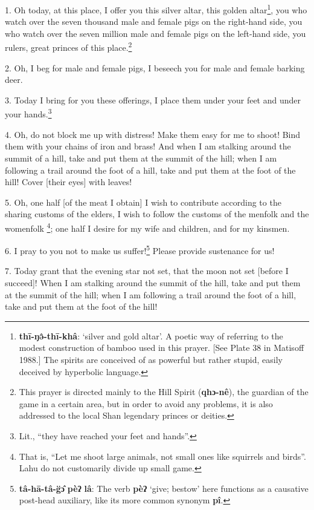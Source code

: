 \setcounter{footnote}{0}

1. Oh today, at this place, I offer you this silver altar, this golden altar\footnote{\textbf{thī-ŋə̂-thī-khâ}: `silver and gold altar'. A poetic way of referring to the modest construction of bamboo used in this prayer. [See Plate 38 in Matisoff 1988.] The spirits are conceived of as powerful but rather stupid, easily deceived by hyperbolic language.},
you who watch over the seven thousand male and female pigs on the right-hand side,
you who watch over the seven million male and female pigs on the left-hand side,
you rulers, great princes of this place.\footnote{This prayer is directed mainly to the Hill Spirit (\textbf{qhɔ-nê}), the guardian of the game in a certain area, but in order to avoid any problems, it is also addressed to the local Shan legendary princes or deities.}

2. Oh, I beg for male and female pigs, I beseech you for male and female barking
deer.

3. Today I bring for you these offerings, I place them under your feet and under
your hands.\footnote{Lit., ``they have reached your feet and hands''.}

4. Oh, do not block me up with distress! Make them easy for me to shoot! Bind them
with your chains of iron and brass! And when I am stalking around the summit of
a hill, take and put them at the summit of the hill; when I am following a trail
around the foot of a hill, take and put them at the foot of the hill! Cover [their
eyes] with leaves!

5. Oh, one half [of the meat I obtain] I wish to contribute according to the sharing
customs of the elders, I wish to follow the customs of the menfolk and the womenfolk
\footnote{That is, ``Let me shoot large animals, not small ones like squirrels and birds''. Lahu do not customarily divide up small game.}; one half I desire for my wife and children, and for my kinsmen.

6. I pray to you not to make us suffer!\footnote{\textbf{tâ-hā-tâ-g̈ɔ̂} \textbf{pèʔ} \textbf{lâ}: The verb \textbf{pèʔ} `give; bestow' here functions as a causative post-head auxiliary, like its more common synonym \textbf{pî}.} Please provide sustenance for us!

7. Today grant that the evening star not set, that the moon not set [before I succeed]!
When I am stalking around the summit of the hill, take and put them at the summit
of the hill; when I am following a trail around the foot of a hill, take and put
them at the foot of the hill!

